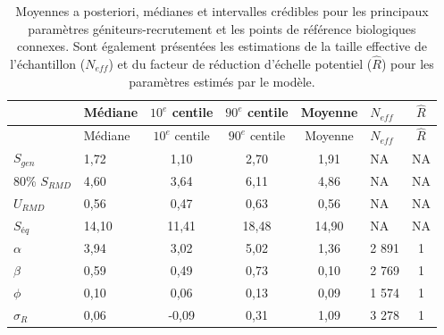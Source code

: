 \documentclass[french,11pt]{book}
\begin{document}
\begin{longtable}[]{@{}llccclc@{}}
\caption{\label{tab:tab-bench-parms}Moyennes a posteriori, médianes et intervalles crédibles pour les principaux paramètres géniteurs-recrutement et les points de référence biologiques connexes. Sont également présentées les estimations de la taille effective de l'échantillon (\(N_{eff}\)) et du facteur de réduction d'échelle potentiel (\(\hat{R}\)) pour les paramètres estimés par le modèle.}\tabularnewline
\toprule\noalign{}
& Médiane & \(10^{e}\) centile & \(90^{e}\) centile & Moyenne & \(N_{eff}\) & \(\hat{R}\) \\
\midrule\noalign{}
\endfirsthead
\toprule\noalign{}
& Médiane & \(10^{e}\) centile & \(90^{e}\) centile & Moyenne & \(N_{eff}\) & \(\hat{R}\) \\
\midrule\noalign{}
\endhead
\bottomrule\noalign{}
\endlastfoot
\(S_{gen}\) & 1,72 & 1,10 & 2,70 & 1,91 & NA & NA \\
80\% \(S_{RMD}\) & 4,60 & 3,64 & 6,11 & 4,86 & NA & NA \\
\(U_{RMD}\) & 0,56 & 0,47 & 0,63 & 0,56 & NA & NA \\
\(S_{éq}\) & 14,10 & 11,41 & 18,48 & 14,90 & NA & NA \\
\(\alpha\) & 3,94 & 3,02 & 5,02 & 1,36 & 2 891 & 1 \\
\(\beta\) & 0,59 & 0,49 & 0,73 & 0,10 & 2 769 & 1 \\
\(\phi\) & 0,10 & 0,06 & 0,13 & 0,09 & 1 574 & 1 \\
\(\sigma_{R}\) & 0,06 & -0,09 & 0,31 & 1,09 & 3 278 & 1 \\
\end{longtable}
\end{document}
